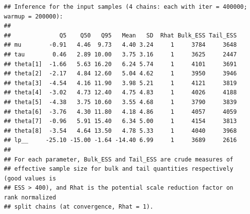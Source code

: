 \documentclass[american,]{article}
\begin{document}
\begin{verbatim}
## Inference for the input samples (4 chains: each with iter = 400000; warmup = 200000):
## 
##              Q5    Q50   Q95   Mean   SD  Rhat Bulk_ESS Tail_ESS
## mu        -0.91   4.46  9.73   4.40 3.24     1     3784     3648
## tau        0.46   2.89 10.00   3.75 3.16     1     3625     2447
## theta[1]  -1.66   5.63 16.20   6.24 5.74     1     4101     3691
## theta[2]  -2.17   4.84 12.60   5.04 4.62     1     3950     3946
## theta[3]  -4.54   4.16 11.90   3.98 5.21     1     4121     3819
## theta[4]  -3.02   4.73 12.40   4.75 4.83     1     4026     4188
## theta[5]  -4.38   3.75 10.60   3.55 4.68     1     3790     3839
## theta[6]  -3.76   4.30 11.80   4.18 4.86     1     4057     4059
## theta[7]  -0.96   5.91 15.40   6.34 5.00     1     4154     3813
## theta[8]  -3.54   4.64 13.50   4.78 5.33     1     4040     3968
## lp__     -25.10 -15.00 -1.64 -14.40 6.99     1     3689     2616
## 
## For each parameter, Bulk_ESS and Tail_ESS are crude measures of 
## effective sample size for bulk and tail quantities respectively (good values is 
## ESS > 400), and Rhat is the potential scale reduction factor on rank normalized
## split chains (at convergence, Rhat = 1).
\end{verbatim}
\end{document}
